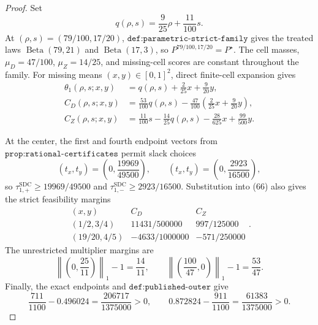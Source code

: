 \documentclass{article}
\begin{document}
\begin{proof}
Set
\[
 q(\rho,s)=\frac9{25}\rho+\frac{11}{100}s.
\]
At \((\rho,s)=(79/100,17/20)\), \(\texttt{def:parametric-strict-family}\) gives the treated laws \(\operatorname{Beta}(79,21)\) and \(\operatorname{Beta}(17,3)\), so \(P^{79/100,17/20}=P^\star\).  The cell masses, \(\mu_D=47/100\), \(\mu_Z=14/25\), and missing-cell scores are constant throughout the family.  For missing means \((x,y)\in[0,1]^2\), direct finite-cell expansion gives
\[
 \begin{aligned}
 \theta_1(\rho,s;x,y)
 &=q(\rho,s)+\frac2{25}x+\frac9{20}y,\\
 C_D(\rho,s;x,y)
 &=\frac{53}{100}q(\rho,s)
   -\frac{47}{100}\left(\frac2{25}x+\frac9{20}y\right),\\
 C_Z(\rho,s;x,y)
 &=\frac{11}{100}s-\frac{14}{25}q(\rho,s)
   -\frac{28}{625}x+\frac{99}{500}y.
 \end{aligned}                                                               \tag{66}
\]

At the center, the first and fourth endpoint vectors from \(\texttt{prop:rational-certificates}\) permit slack choices
\[
 (t_x,t_y)=\left(0,\frac{19969}{49500}\right),
 \qquad
 (t_x,t_y)=\left(0,\frac{2923}{16500}\right),                                \tag{67}
\]
so \(\tau_{1,+}^{\mathrm{SDC}}\ge19969/49500\) and \(\tau_{1,-}^{\mathrm{SDC}}\ge2923/16500\).  Substitution into (66) also gives the strict feasibility margins
\[
\begin{array}{c|cc}
(x,y)&C_D&C_Z\\ \hline
(1/2,3/4)&11431/500000&997/125000\\
(19/20,4/5)&-4633/1000000&-571/250000
\end{array}.                                                                  \tag{68}
\]
The unrestricted multiplier margins are
\[
 \left\|\left(0,\frac{25}{11}\right)\right\|_1-1=\frac{14}{11},
 \qquad
 \left\|\left(\frac{100}{47},0\right)\right\|_1-1=\frac{53}{47}.          \tag{69}
\]
Finally, the exact endpoints and \(\texttt{def:published-outer}\) give
\[
 \frac{711}{1100}-0.496024=\frac{206717}{1375000}>0,
 \qquad
 0.872824-\frac{911}{1100}=\frac{61383}{1375000}>0.                           \tag{70}
\]


\end{proof}
\end{document}
